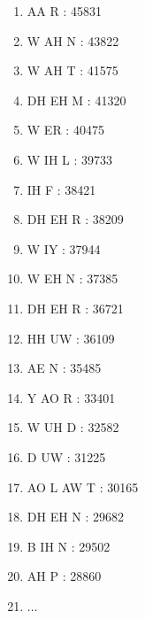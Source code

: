 \documentclass{beamer}
\begin{document}
{\begin{tiny}
\begin{multicols}{4}
\begin{enumerate}
	\item AA R : 45831
	\item W AH N : 43822
	\item W AH T : 41575
	\item DH EH M : 41320
	\item W ER : 40475
	\item W IH L : 39733
	\item IH F : 38421
	\item DH EH R : 38209
	\item W IY : 37944
	\item W EH N : 37385
	\item DH EH R : 36721
	\item HH UW : 36109
	\item AE N : 35485
	\item Y AO R : 33401
	\item W UH D : 32582
	\item D UW : 31225
	\item AO L AW T : 30165
	\item DH EH N : 29682
	\item B IH N : 29502
	\item AH P : 28860
	\item[] $\ldots$
\end{enumerate}
\end{multicols}
\end{tiny}
}
\end{document}
